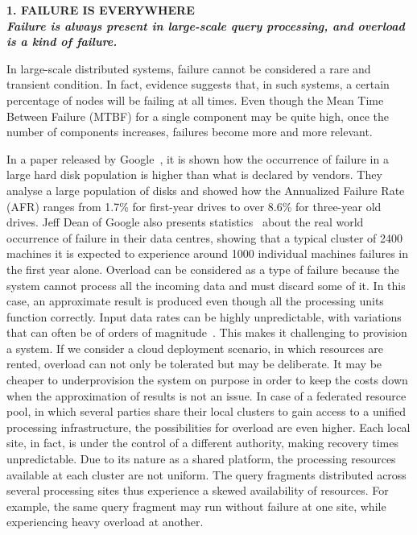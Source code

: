 \textbf{1. FAILURE IS EVERYWHERE\\ \textit{Failure is always present in large-scale query processing,
and overload is a kind of failure.}}

  In large-scale distributed systems, failure cannot be considered a rare and transient condition.
  In fact, evidence suggests that, in such systems, a certain percentage of nodes will be failing at
  all times. Even though the Mean Time Between Failure (MTBF) for a single component may be quite high,
  once the number of components increases, failures become more and more relevant. 

  In a paper released by Google~\cite{google-failure-disks}, it is shown how the occurrence of failure in
  a large hard disk population is higher than what is declared by vendors. They analyse a large
  population of disks and showed how the Annualized Failure Rate (AFR) ranges from 1.7\% for first-year
  drives to over 8.6\% for three-year old drives.
  Jeff Dean of Google also presents statistics~\cite{google-failure-talk} about the real world occurrence
  of failure in their data centres, showing that a typical cluster of 2400 machines it is expected to
  experience around 1000 individual machines failures in the first year alone. 
%   
  Overload can be considered as a type of failure because the system cannot process all the
  incoming data and must discard some of it. In this case, an approximate result is produced even
  though all the processing units function correctly.
  Input data rates can be highly unpredictable, with variations that can often be of orders of
  magnitude~\cite{load-shedding}. This makes it challenging to provision a system. 
  If we consider a cloud deployment scenario, in which resources are rented, overload can not
  only be tolerated but may be deliberate. It may be cheaper to underprovision the system on purpose in
  order to keep the costs down when the approximation of results is not an issue.  
  In case of a federated resource pool, in which several parties share their local clusters to gain access
  to a unified processing infrastructure, the possibilities for overload are even higher. Each local
  site, in fact, is under the control of a different authority, making recovery
  times unpredictable. Due to its nature as a shared platform, the processing resources available at each
  cluster are not uniform. The query fragments distributed across several processing sites thus
  experience a skewed availability of resources. For example, the same query fragment may run without failure at one
  site, while experiencing heavy overload at another.\\

